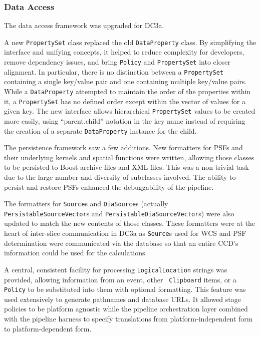 
\subsubsection{Data Access}

The data access framework was upgraded for DC3a.

A new {\tt PropertySet} class replaced the old {\tt DataProperty} class.
By simplifying the interface and unifying concepts, it helped to reduce
complexity for developers, remove dependency issues, and bring
{\tt Policy} and {\tt PropertySet} into closer alignment.  In
particular, there is no distinction between a {\tt PropertySet}
containing a single key/value pair and one containing multiple key/value
pairs.  While a {\tt DataProperty} attempted to maintain the order of
the properties within it, a {\tt PropertySet} has no defined order
except within the vector of values for a given key.  The new interface
allows hierarchical {\tt PropertySet} values to be created more easily,
using ``parent.child'' notation in the key name instead of requiring the
creation of a separate {\tt DataProperty} instance for the child.

The persistence framework saw a few additions.  New formatters for PSFs
and their underlying kernels and spatial functions were written,
allowing those classes to be persisted to Boost archive files and XML
files.  This was a non-trivial task due to the large number and
diversity of subclasses involved.  The ability to persist and restore
PSFs enhanced the debuggability of the pipeline.

The formatters for {\tt Source}s and {\tt DiaSource}s (actually {\tt
PersistableSourceVector}s and {\tt PersistableDiaSourceVector}s) were
also updated to match the new contents of those classes.  These
formatters were at the heart of inter-slice communication in DC3a as
{\tt Source}s used for WCS and PSF determination were communicated via
the database so that an entire CCD's information could be used for the
calculations.

A central, consistent facility for processing {\tt LogicalLocation}
strings was provided, allowing information from an event, other {\tt
Clipboard} items, or a {\tt Policy} to be substituted into them with
optional formatting.  This feature was used extensively to generate
pathnames and database URLs.  It allowed stage policies to be
platform agnostic while the pipeline orchestration layer combined
with the pipeline harness to specify translations from
platform-independent form to platform-dependent form.

